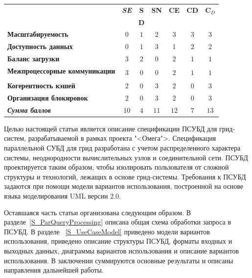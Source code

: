 \documentclass[11pt,oneside]{article}
\begin{document}
	\begin{table}[h!]
		\begin{tabular}{|l|c|c|c|c|c|c|}
			\hline
			& \textit{\textbf{SE}} & \textbf{S} & \textbf{SN} & \textbf{CE} & \textbf{CD} & \textbf{C}$_D$ \\
			& & \textbf{D} & & & & \\
			\hline
			\textbf{Масштабируемость} & $0$ & $1$ & $2$ & $3$ & $3$ & $3$ \\
			\hline
			\textbf{Доступность данных} & $0$ & $1$ & $3$ & $1$ & $2$ & $2$ \\
			\hline
			\textbf{Баланс загрузки} & $3$ & $2$ & $0$ & $2$ & $1$ & $1$ \\
			\hline
			\textbf{Межпроцессорные коммуникации} & \multirow{2}{*}{$3$} & \multirow{2}{*}{$0$} & \multirow{2}{*}{$0$} & \multirow{2}{*}{$2$} & \multirow{2}{*}{$1$} & \multirow{2}{*}{$1$} \\
			& & & & & & \\
			\hline
			\textbf{Когерентность кэшей} & $2$ & $0$ & $3$ & $2$ & $0$ & $3$ \\
			\hline
			\textbf{Организация блокировок} & $2$ & $0$ & $3$ & $2$ & $0$ & $3$ \\
			\hline
			\textit{\textbf{Сумма баллов}} & $10$ & $4$ & $11$ & $12$ & $7$ & $13$ \\
			\hline
		\end{tabular}
		\label{Tab:t}
	\end{table}
	
	\par Целью настоящей статьи является описание спецификации ПСУБД для грид-систем, разрабатываемой в рамках проекта "<Омега">\cite{B_OMEGA}. Спецификация параллельной СУБД для грид разработана с учетом распределенного характера системы, неоднородности вычислительных узлов и соединительной сети. ПСУБД проектируется таким образом, чтобы изолировать пользователя от сложной структуры и технологий, лежащих в основе грид-системы. Требования к ПСУБД задаются при помощи модели вариантов использования, построенной на основе языка моделирования UML версии 2.0.
	\par Оставшаяся часть статьи организована следующим образом. В разделе~\ref{S_ParQueryProcessing} описана общая схема обработки запроса в ПСУБД. В разделе ~\ref{S_UseCaseModel} приведено модели вариантов использования, приведено описание структуры ПСУБД, форматы входных и выходных данных, диаграммы вариантов использования и описание вариантов использования. В заключении суммируются основные результаты и описаны направления дальнейшей работы.
	
\end{document}
